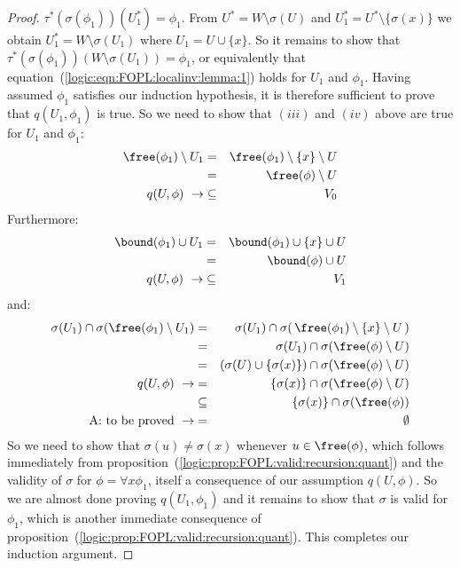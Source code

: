 \begin{proof}
$\tau^{*}(\sigma(\phi_{1}))(U_{1}^{*})=\phi_{1}$. From
$U^{*}=W\setminus\sigma(U)$ and
$U_{1}^{*}=U^{*}\setminus\{\sigma(x)\}$ we obtain
$U_{1}^{*}=W\setminus\sigma(U_{1})$ where $U_{1}=U\cup\{x\}$. So it
remains to show that
$\tau^{*}(\sigma(\phi_{1}))(W\setminus\sigma(U_{1}))=\phi_{1}$, or
equivalently that equation~(\ref{logic:eqn:FOPL:localinv:lemma:1})
holds for $U_{1}$ and $\phi_{1}$. Having assumed $\phi_{1}$
satisfies our induction hypothesis, it is therefore sufficient to
prove that $q(U_{1},\phi_{1})$ is true. So we need to show that
$(iii)$ and $(iv)$ above are true for $U_{1}$ and $\phi_{1}$:
    \begin{eqnarray*}
    \free(\phi_{1})\setminus
    U_{1}&=&\free(\phi_{1})\setminus\{x\}\setminus U\\
    &=&\free(\phi)\setminus U\\
    q(U,\phi)\ \rightarrow&\subseteq&V_{0}
    \end{eqnarray*}
Furthermore:
    \begin{eqnarray*}
    \bound(\phi_{1})\cup U_{1}&=&\bound(\phi_{1})\cup\{x\}\cup U\\
    &=&\bound(\phi)\cup U\\
    q(U,\phi)\ \rightarrow&\subseteq& V_{1}
    \end{eqnarray*}
and:
    \begin{eqnarray*}
    \sigma(U_{1})\cap\sigma(\free(\phi_{1})\setminus U_{1})
    &=&\sigma(U_{1})\cap\sigma(\,\free(\phi_{1})\setminus\{x\}\setminus
    U\,)\\
    &=&\sigma(U_{1})\cap\sigma(\free(\phi)\setminus U)\\
    &=&(\sigma(U)\cup\{\sigma(x)\})\cap\sigma(\free(\phi)\setminus
    U)\\
    q(U,\phi)\ \rightarrow&=&\{\sigma(x)\}\cap\sigma(\free(\phi)\setminus
    U)\\
    &\subseteq&\{\sigma(x)\}\cap\sigma(\free(\phi))\\
    \mbox{A: to be proved}\ \rightarrow&=&\emptyset
    \end{eqnarray*}
So we need to show that $\sigma(u)\neq\sigma(x)$ whenever
$u\in\free(\phi)$, which follows immediately from
proposition~(\ref{logic:prop:FOPL:valid:recursion:quant}) and the
validity of $\sigma$ for $\phi=\forall x\phi_{1}$, itself a
consequence of our assumption $q(U,\phi)$. So we are almost done
proving $q(U_{1},\phi_{1})$ and it remains to show that $\sigma$ is
valid for $\phi_{1}$, which is another immediate consequence of
proposition~(\ref{logic:prop:FOPL:valid:recursion:quant}). This
completes our induction argument.
\end{proof}
